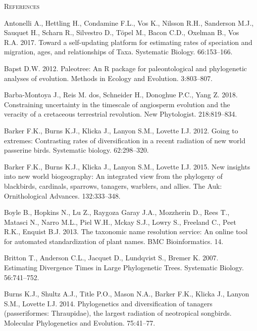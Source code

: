 \documentclass[]{article}
\begin{document}
\begin{center}
\textsc{References}
\end{center}

\hypertarget{refs}{}
\leavevmode\hypertarget{ref-antonelli2017supersmart}{}%
Antonelli A., Hettling H., Condamine F.L., Vos K., Nilsson R.H., Sanderson M.J., Sauquet H., Scharn R., Silvestro D., Töpel M., Bacon C.D., Oxelman B., Vos R.A. 2017. Toward a self-updating platform for estimating rates of speciation and migration, ages, and relationships of Taxa. Systematic Biology. 66:153--166.

\leavevmode\hypertarget{ref-Bapst2012a}{}%
Bapst D.W. 2012. Paleotree: An R package for paleontological and phylogenetic analyses of evolution. Methods in Ecology and Evolution. 3:803--807.

\leavevmode\hypertarget{ref-barba2018constraining}{}%
Barba-Montoya J., Reis M. dos, Schneider H., Donoghue P.C., Yang Z. 2018. Constraining uncertainty in the timescale of angiosperm evolution and the veracity of a cretaceous terrestrial revolution. New Phytologist. 218:819--834.

\leavevmode\hypertarget{ref-barker2012going}{}%
Barker F.K., Burns K.J., Klicka J., Lanyon S.M., Lovette I.J. 2012. Going to extremes: Contrasting rates of diversification in a recent radiation of new world passerine birds. Systematic biology. 62:298--320.

\leavevmode\hypertarget{ref-barker2015new}{}%
Barker F.K., Burns K.J., Klicka J., Lanyon S.M., Lovette I.J. 2015. New insights into new world biogeography: An integrated view from the phylogeny of blackbirds, cardinals, sparrows, tanagers, warblers, and allies. The Auk: Ornithological Advances. 132:333--348.

\leavevmode\hypertarget{ref-Boyle2013}{}%
Boyle B., Hopkins N., Lu Z., Raygoza Garay J.A., Mozzherin D., Rees T., Matasci N., Narro M.L., Piel W.H., Mckay S.J., Lowry S., Freeland C., Peet R.K., Enquist B.J. 2013. The taxonomic name resolution service: An online tool for automated standardization of plant names. BMC Bioinformatics. 14.

\leavevmode\hypertarget{ref-Britton2007}{}%
Britton T., Anderson C.L., Jacquet D., Lundqvist S., Bremer K. 2007. Estimating Divergence Times in Large Phylogenetic Trees. Systematic Biology. 56:741--752.

\leavevmode\hypertarget{ref-burns2014phylogenetics}{}%
Burns K.J., Shultz A.J., Title P.O., Mason N.A., Barker F.K., Klicka J., Lanyon S.M., Lovette I.J. 2014. Phylogenetics and diversification of tanagers (passeriformes: Thraupidae), the largest radiation of neotropical songbirds. Molecular Phylogenetics and Evolution. 75:41--77.
\end{document}
